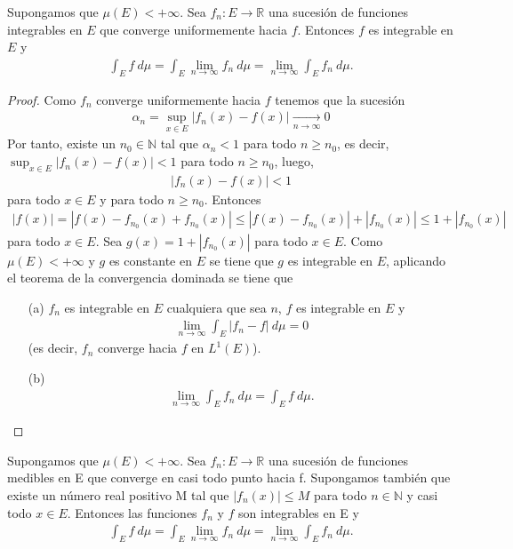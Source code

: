 \begin{cor}
Supongamos que $\mu(E) < +\infty$. Sea $f_n: E \longrightarrow \mathbb{R}$ una sucesión de funciones integrables en $E$ que converge uniformemente hacia $f$. Entonces $f$ es integrable en $E$ y
\begin{align*}
    \int_{E}{f \ d\mu} = \int_{E}{\lim_{n \to \infty}{f_n \ d\mu}} = \lim_{n \to \infty}{\int_{E}{f_n \ d\mu}}.
\end{align*}
\end{cor}

\begin{proof}
Como $f_n$ converge uniformemente hacia $f$ tenemos que la sucesión
\begin{align*}
    \alpha_n = \sup_{x \in E}{|f_n(x) - f(x)|} \xrightarrow[n \to \infty]{} 0
\end{align*}
Por tanto, existe un $n_0 \in \mathbb{N}$ tal que $\alpha_n < 1$ para todo $n \ge n_0$, es decir, $\sup_{x \in E}{|f_n(x) - f(x)|} < 1$ para todo $n \ge n_0$, luego,
\begin{align*}
    |f_n(x) - f(x)| < 1
\end{align*}
para todo $x \in E$ y para todo $n \ge n_0$. Entonces
\begin{align*}
    |f(x)| = |f(x) - f_{n_0}(x) + f_{n_0}(x)| \leq |f(x) - f_{n_0}(x)| + |f_{n_0}(x)| \leq 1 + |f_{n_0}(x)|
\end{align*}
para todo $x \in E$. Sea $g(x) = 1 + |f_{n_0}(x)|$ para todo $x \in E$. Como $\mu(E) < +\infty$ y $g$ es constante en $E$ se tiene que $g$ es integrable en $E$, aplicando el teorema de la convergencia dominada se tiene que
\begin{enumerate}
    \item[(a)] $f_n$ es integrable en $E$ cualquiera que sea $n$, $f$ es integrable en $E$ y
    \begin{align*}
        \lim_{n \to \infty}{\int_{E}{|f_n - f| \ d\mu}} = 0
    \end{align*}
    (es decir, $f_n$ converge hacia $f$ en $L^1(E)$).
    \item[(b)] 
    \begin{align*}
        \lim_{n \to \infty}{\int_{E}{f_n \ d\mu}} = \int_{E}{f \ d\mu}.
    \end{align*}
\end{enumerate}
\end{proof}

\begin{cor}
Supongamos que $\mu(E) < +\infty$. Sea $f_n: E \longrightarrow \mathbb{R}$ una sucesión de funciones medibles en E que converge en casi todo punto hacia f. Supongamos también que existe un número real positivo M tal que $|f_n(x)| \leq M$ para todo $n \in \mathbb{N}$ y casi todo $x \in E$. Entonces las funciones $f_n$ y $f$ son integrables en E y 
\begin{align*}
    \int_{E}{f \ d\mu} = \int_{E}{\lim_{n \to \infty}{f_n \ d\mu}} = \lim_{n \to \infty}{\int_{E}{f_n \ d\mu}}.
\end{align*}
\end{cor}

